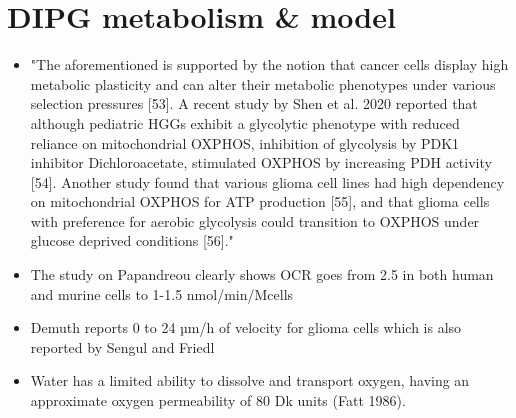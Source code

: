 \documentclass[11pt,a4paper]{article}
\begin{document}
\section{DIPG metabolism \& model}
\begin{itemize}
\item
"The aforementioned is supported by the notion that cancer cells display high metabolic plasticity and can alter their metabolic phenotypes under various selection pressures [53]. A recent study by Shen et al. 2020 reported that although pediatric HGGs exhibit a glycolytic phenotype with reduced reliance on mitochondrial OXPHOS, inhibition of glycolysis by PDK1 inhibitor Dichloroacetate, stimulated OXPHOS by increasing PDH activity [54]. Another study found that various glioma cell lines had high dependency on mitochondrial OXPHOS for ATP production [55], and that glioma cells with preference for aerobic glycolysis could transition to OXPHOS under glucose deprived conditions [56]."\cite{Mudassar2020}
\item The study on Papandreou clearly shows OCR goes from 2.5 in both human and murine cells to  1-1.5 nmol/min/Mcells
\item Demuth \cite{Demuth2000} reports 0 to 24 µm/h of velocity for glioma cells which is also reported by Sengul \cite{Sengul2021} and Friedl \cite{Friedl2003} 

\item Water has a limited ability to dissolve and transport oxygen, having an approximate oxygen permeability of 80 Dk units (Fatt 1986). 
\end{itemize}
\newpage



\end{document}

